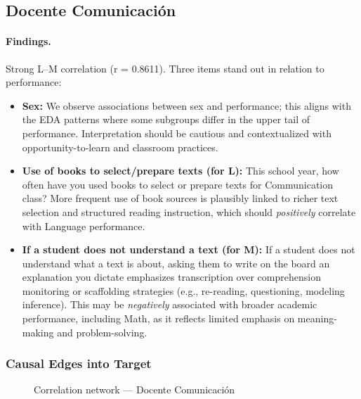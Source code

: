 \documentclass[11pt, a4paper]{article}
\begin{document}
\subsection{Docente Comunicación}
\paragraph{Findings.}
Strong L–M correlation (r = 0.8611). Three items stand out in relation to performance:
\begin{itemize}
  \item \textbf{Sex:} We observe associations between sex and performance; this aligns with the EDA patterns where some subgroups differ in the upper tail of performance. Interpretation should be cautious and contextualized with opportunity-to-learn and classroom practices.
  \item \textbf{Use of books to select/prepare texts (for L):} This school year, how often have you used books to select or prepare texts for Communication class? More frequent use of book sources is plausibly linked to richer text selection and structured reading instruction, which should \emph{positively} correlate with Language performance.
  \item \textbf{If a student does not understand a text (for M):} If a student does not understand what a text is about, asking them to write on the board an explanation you dictate emphasizes transcription over comprehension monitoring or scaffolding strategies (e.g., re-reading, questioning, modeling inference). This may be \emph{negatively} associated with broader academic performance, including Math, as it reflects limited emphasis on meaning-making and problem-solving.
\end{itemize}

\subsubsection*{Causal Edges into Target}
\begin{figure}[h]
  \centering
  \caption{Correlation network — Docente Comunicación}
\end{figure}
\end{document}
